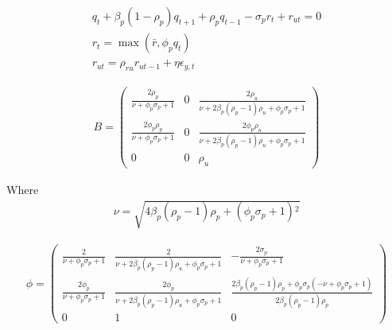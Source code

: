 \documentclass[12pt]{article}
\begin{document}
\begin{gather*}
q_{t} +\beta_p(1 - \rho_p)q_{t + 1} + \rho_pq_{t - 1} - \sigma_pr_{t} +
     r_{ut}=0\\
 r_{t} = \max (\bar{r}, \phi_pq_{t}) \\
 r_{ut} = \rho_{ru} r_{ut - 1} + \eta \epsilon_{y,t}
\end{gather*}


\begin{gather*}
  B=   \left(
   \begin{array}{ccc}
    \frac{2 \rho _p}{\nu +\phi _p \sigma _p+1} & 0 & \frac{2 \rho _u}{\nu +2
      \beta _p \left(\rho _p-1\right) \rho _u+\phi _p \sigma _p+1} \\
    \frac{2 \phi _p \rho _p}{\nu +\phi _p \sigma _p+1} & 0 & \frac{2 \phi _p
      \rho _u}{\nu +2 \beta _p \left(\rho _p-1\right) \rho _u+\phi _p \sigma
      _p+1} \\
    0 & 0 & \rho _u
   \end{array}
   \right)
\end{gather*}

Where
\begin{gather*}
  \nu=    \sqrt{4 \beta _p \left(\rho _p-1\right) \rho _p+\left(\phi _p \sigma
    _p+1\right){}^2}
\end{gather*}



\newcommand{\tVec}{
  \begin{bmatrix}
    q_t\\r_{rt}\\r_{ut}
  \end{bmatrix}}



\begin{gather*}
  \phi=   \left(
   \begin{array}{ccc}
    \frac{2}{\nu +\phi _p \sigma _p+1} & \frac{2}{\nu +2 \beta _p \left(\rho
      _p-1\right) \rho _u+\phi _p \sigma _p+1} & -\frac{2 \sigma _p}{\nu +\phi
      _p \sigma _p+1} \\
    \frac{2 \phi _p}{\nu +\phi _p \sigma _p+1} & \frac{2 \phi _p}{\nu +2 \beta
      _p \left(\rho _p-1\right) \rho _u+\phi _p \sigma _p+1} & \frac{2 \beta
      _p \left(\rho _p-1\right) \rho _p+\phi _p \sigma _p \left(-\nu +\phi _p
      \sigma _p+1\right)}{2 \beta _p \left(\rho _p-1\right) \rho _p} \\
    0 & 1 & 0
   \end{array}
   \right)
\end{gather*}
\end{document}
